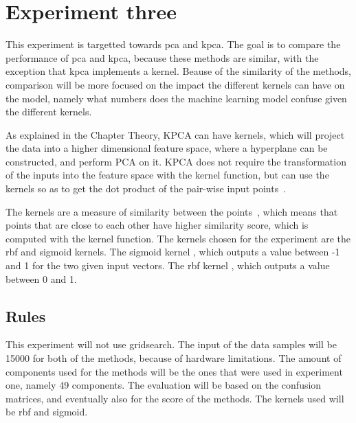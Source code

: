
\section{Experiment three}
This experiment is targetted towards \gls{pca} and \gls{kpca}. The goal is to compare the performance of \gls{pca} and \gls{kpca}, because these methods are similar, with the exception that \gls{kpca} implements a kernel. Beause of the similarity of the methods, comparison will be more focused on the impact the different kernels can have on the model, namely what numbers does the machine learning model confuse given the different kernels.


As explained in the Chapter Theory, KPCA can have kernels, which will project the data into a higher dimensional feature space, where a hyperplane can be constructed, and perform PCA on it. KPCA does not require the transformation of the inputs into the feature space with the kernel function, but can use the kernels so as to get the dot product of the pair-wise input points~\cite{kpca-book}.


The kernels are a measure of similarity between the points~\cite{scikit-learn}, which means that points that are close to each other have higher similarity score, which is computed with the kernel function. The kernels chosen for the experiment are the \gls{rbf} and sigmoid kernels. The sigmoid kernel , which outputs a value between -1 and 1 for the two given input vectors. The \gls{rbf} kernel , which outputs a value between 0 and 1.


\subsection{Rules}
This experiment will not use gridsearch. The input of the data samples will be 15000 for both of the methods, because of hardware limitations. The amount of components used for the methods will be the ones that were used in experiment one, namely 49 components. The evaluation will be based on the confusion matrices, and eventually also for the score of the methods. The kernels used will be \gls{rbf} and sigmoid.


